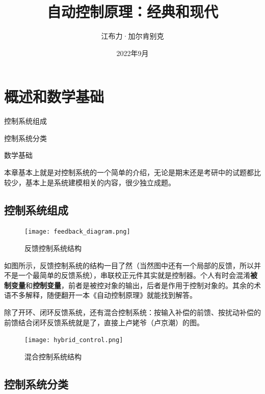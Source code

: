 \documentclass[lang=cn,10pt]{elegantbook}
\title{自动控制原理：经典和现代}
\author{江布力·加尔肯别克}
\date{2022年9月}
\begin{document}
\maketitle
\frontmatter

\tableofcontents

\mainmatter


\chapter{概述和数学基础}

\begin{introduction}
  \item 控制系统组成~
  \item 控制系统分类~
  \item 数学基础~
\end{introduction}

本章基本上就是对控制系统的一个简单的介绍，无论是期末还是考研中的试题都比较少，基本上是系统建模相关的内容，很少独立成题。

\section{控制系统组成}

\begin{figure}[htbp]
  \centering
  \texttt{[image: feedback\_diagram.png]}
  \caption{反馈控制系统结构} \label{fig:feedback_diagram}
\end{figure}

如图所示，反馈控制系统的结构一目了然（当然图中还有一个局部的反馈，所以并不是一个最简单的反馈系统），串联校正元件其实就是控制器。个人有时会混淆\textbf{被制变量}和\textbf{控制变量}，前者是被控对象的输出，后者是作用于控制对象的。其余的术语不多解释，随便翻开一本《自动控制原理》就能找到解答。

除了开环、闭环反馈系统，还有混合控制系统：按输入补偿的前馈、按扰动补偿的前馈结合闭环反馈系统就是了，直接上卢姥爷（卢京潮）的图。

\begin{figure}[htbp]
  \centering
  \texttt{[image: hybrid\_control.png]}
  \caption{混合控制系统结构} \label{fig:hybrid_control}
\end{figure}

\section{控制系统分类}
\end{document}
